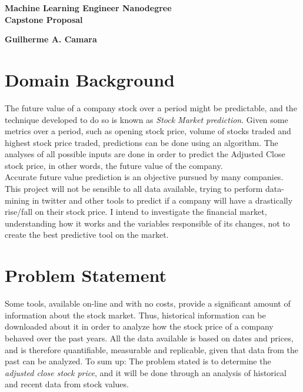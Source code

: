 \documentclass[a4paper, 11pt]{article}
\begin{document}
\noindent
\begin{center}
\large\textbf{Machine Learning Engineer Nanodegree}\\ 
\large\textbf{Capstone Proposal}\\ 
\end{center}


\hfill \textbf{Guilherme A. Camara}


\section*{Domain Background}
The future value of a company stock over a period might be predictable, and the technique developed to do so is known as \emph{Stock Market prediction}\cite{Wiki}. 
Given some metrics over a period, such as opening stock price, volume of stocks traded and highest stock price traded, predictions can be done using an algorithm.
The analyses of all possible inputs are done in order to predict the Adjusted Close stock price, in other words, the future value of the company.
\newline
\\
Accurate future value prediction is an objective pursued by many companies. This project will not be sensible to all data available, trying to perform data-mining in twitter and other tools to predict if a company will have a drastically rise/fall on their stock price.
I intend to investigate the financial market, understanding how it works and the variables responsible of its changes, not to create the best predictive tool on the market. \\ 


\section*{Problem Statement}
Some tools, available on-line and with no costs, provide a significant amount of information about the stock market. Thus, historical information can be downloaded about it in order to analyze  how the stock price of a company behaved over the past years.
All the data available is based on dates and prices, and is therefore quantifiable, measurable and replicable, given that data from the past can be analyzed.
To sum up: The problem stated is to determine the \emph{adjusted close stock price}, and it will be done through an analysis of historical and recent data from stock values.\\ 
\end{document}
